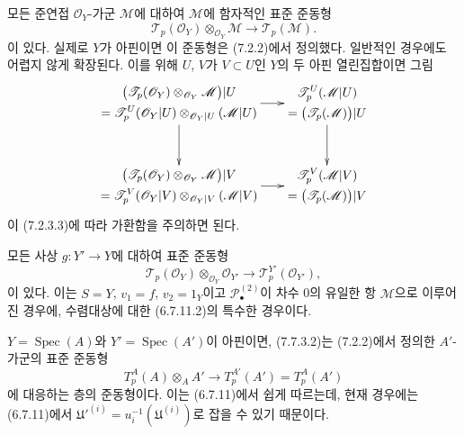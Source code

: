 \begin{env}[7.7.3]
\label{III.7.7.3-fr}
모든 준연접 $\mathscr O_Y$-가군 $\mathscr M$에 대하여 $\mathscr M$에
함자적인 표준 준동형
\[
  \mathscr T_p(\mathscr O_Y)\otimes_{\mathscr O_Y}\mathscr M
  \longrightarrow
  \mathscr T_p(\mathscr M).
  \tag{7.7.3.1}\label{III.7.7.3.1.fr}
\]
이 있다. 실제로 $Y$가 아핀이면 이 준동형은 (7.2.2)에서 정의했다.
일반적인 경우에도 어렵지 않게 확장된다. 이를 위해 $U$, $V$가
$V\subset U$인 $Y$의 두 아핀 열린집합이면 그림
\[
\xymatrix@C=18pt@R=32pt{
  {\begin{gathered}
    \bigl(\mathscr T_p(\mathscr O_Y)
      \otimes_{\mathscr O_Y}\mathscr M\bigr)|U\\
    =\mathscr T^U_p(\mathscr O_Y|U)
      \otimes_{\mathscr O_Y|U}(\mathscr M|U)
  \end{gathered}}
  \ar[r]\ar[d]
  &
  {\begin{gathered}
    \mathscr T^U_p(\mathscr M|U)\\
    =\bigl(\mathscr T_p(\mathscr M)\bigr)|U
  \end{gathered}}
  \ar[d]
  \\
  {\begin{gathered}
    \bigl(\mathscr T_p(\mathscr O_Y)
      \otimes_{\mathscr O_Y}\mathscr M\bigr)|V\\
    =\mathscr T^V_p(\mathscr O_Y|V)
      \otimes_{\mathscr O_Y|V}(\mathscr M|V)
  \end{gathered}}
  \ar[r]
  &
  {\begin{gathered}
    \mathscr T^V_p(\mathscr M|V)\\
    =\bigl(\mathscr T_p(\mathscr M)\bigr)|V
  \end{gathered}}
}
\]
이 (7.2.3.3)에 따라 가환함을 주의하면 된다.

모든 사상 $g:Y'\to Y$에 대하여 표준 준동형
\[
  \mathscr T_p(\mathscr O_Y)\otimes_{\mathscr O_Y}\mathscr O_{Y'}
  \longrightarrow
  \mathscr T^{Y'}_p(\mathscr O_{Y'}),
  \tag{7.7.3.2}\label{III.7.7.3.2.fr}
\]
이 있다. 이는 $S=Y$, $v_1=f$, $v_2=1_Y$이고
$\mathscr P^{(2)}_\bullet$이 차수 0의 유일한 항 $\mathscr M$으로
이루어진 경우에, 수렴대상에 대한 (6.7.11.2)의 특수한 경우이다.

$Y=\operatorname{Spec}(A)$와 $Y'=\operatorname{Spec}(A')$이 아핀이면,
(7.7.3.2)는 (7.2.2)에서 정의한 $A'$-가군의 표준 준동형
\[
  T^A_p(A)\otimes_A A'
  \longrightarrow
  T^{A'}_p(A')=T^A_p(A')
\]
에 대응하는 층의 준동형이다. 이는 (6.7.11)에서 쉽게 따르는데, 현재
경우에는 (6.7.11)에서
$\mathfrak U'^{(i)}=u_i^{-1}(\mathfrak U^{(i)})$로 잡을 수 있기 때문이다.
\end{env}

